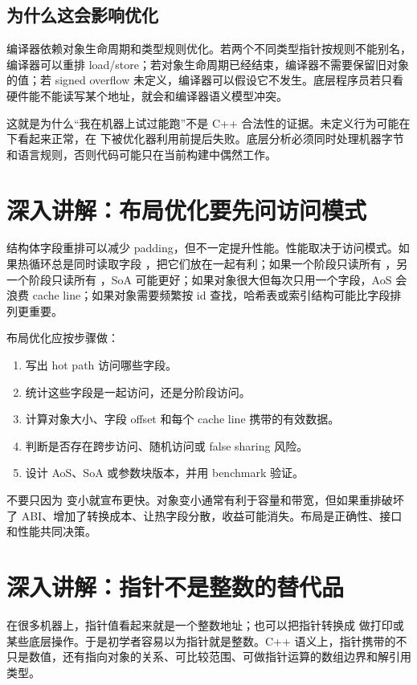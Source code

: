 \subsection{为什么这会影响优化}

编译器依赖对象生命周期和类型规则优化。若两个不同类型指针按规则不能别名，编译器可以重排 load/store；若对象生命周期已经结束，编译器不需要保留旧对象的值；若 signed overflow 未定义，编译器可以假设它不发生。底层程序员若只看硬件能不能读写某个地址，就会和编译器语义模型冲突。

这就是为什么“我在机器上试过能跑”不是 C++ 合法性的证据。未定义行为可能在  下看起来正常，在  下被优化器利用前提后失败。底层分析必须同时处理机器字节和语言规则，否则代码可能只在当前构建中偶然工作。

\section{深入讲解：布局优化要先问访问模式}

结构体字段重排可以减少 padding，但不一定提升性能。性能取决于访问模式。如果热循环总是同时读取字段 ，把它们放在一起有利；如果一个阶段只读所有 ，另一个阶段只读所有 ，SoA 可能更好；如果对象很大但每次只用一个字段，AoS 会浪费 cache line；如果对象需要频繁按 id 查找，哈希表或索引结构可能比字段排列更重要。

布局优化应按步骤做：

\begin{enumerate}
  \item 写出 hot path 访问哪些字段。
  \item 统计这些字段是一起访问，还是分阶段访问。
  \item 计算对象大小、字段 offset 和每个 cache line 携带的有效数据。
  \item 判断是否存在跨步访问、随机访问或 false sharing 风险。
  \item 设计 AoS、SoA 或参数块版本，并用 benchmark 验证。
\end{enumerate}

不要只因为  变小就宣布更快。对象变小通常有利于容量和带宽，但如果重排破坏了 ABI、增加了转换成本、让热字段分散，收益可能消失。布局是正确性、接口和性能共同决策。

\section{深入讲解：指针不是整数的替代品}

在很多机器上，指针值看起来就是一个整数地址；也可以把指针转换成  做打印或某些底层操作。于是初学者容易以为指针就是整数。C++ 语义上，指针携带的不只是数值，还有指向对象的关系、可比较范围、可做指针运算的数组边界和解引用类型。


